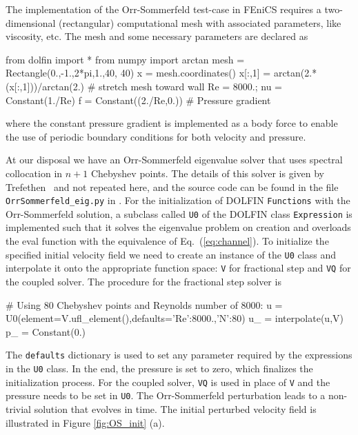 The implementation of the Orr-Sommerfeld test-case in FEniCS requires a two-dimensional (rectangular) computational mesh with associated parameters, like viscosity, etc. The  mesh and some necessary parameters are declared as
\begin{fenicscode}{0.9}
    from dolfin import *
    from numpy import arctan
    mesh = Rectangle(0.,-1.,2*pi,1.,40, 40)
    x = mesh.coordinates()
    x[:,1] = arctan(2.*(x[:,1]))/arctan(2.)  # stretch mesh toward wall
    Re = 8000.; nu = Constant(1./Re)
    f = Constant((2./Re,0.)) # Pressure gradient
\end{fenicscode}
where the constant pressure gradient is implemented as a body force to enable the use of periodic boundary conditions for both velocity and pressure. 

At our disposal we have an Orr-Sommerfeld eigenvalue solver that uses spectral collocation in $n+1$ Chebyshev points. The details of this solver is given by Trefethen~\cite{tref06} and not repeated here, and the source code can be found in the file {\fontsize{12pt}{12pt}\verb!OrrSommerfeld_eig.py!} in \cite{folder}. For the initialization of DOLFIN {\fontsize{12pt}{12pt}\texttt{Functions}} with the Orr-Sommerfeld solution, a subclass called {\fontsize{12pt}{12pt}\texttt{U0}} of the DOLFIN class {\fontsize{12pt}{12pt}\texttt{Expression}} is implemented such that it solves the eigenvalue problem on creation and overloads the eval function with the equivalence of Eq.~(\ref{eq:channel}). To initialize the specified initial velocity field we need to create an instance of the {\fontsize{12pt}{12pt}\texttt{U0}} class and interpolate it onto the appropriate function space: {\fontsize{12pt}{12pt}\texttt{V}} for fractional step and {\fontsize{12pt}{12pt}\texttt{VQ}} for the coupled solver. The procedure for the fractional step solver is
\begin{fenicscode}{0.9}
    # Using 80 Chebyshev points and Reynolds number of 8000:
    u = U0(element=V.ufl_element(),defaults={'Re':8000.,'N':80}) 
    u_ = interpolate(u,V)
    p_ = Constant(0.)
\end{fenicscode}
The {\fontsize{12pt}{12pt}\texttt{defaults}} dictionary is used to set any parameter required by the 
expressions in the {\fontsize{12pt}{12pt}\texttt{U0}} class. In the end, the pressure is set to zero, which finalizes the initialization process. For the coupled solver, {\fontsize{12pt}{12pt}\texttt{VQ}} is used in place of {\fontsize{12pt}{12pt}\texttt{V}} and the pressure needs to be set in {\fontsize{12pt}{12pt}\texttt{U0}}. The Orr-Sommerfeld perturbation leads to a non-trivial solution that evolves in time. The initial perturbed velocity field is illustrated in Figure \ref{fig:OS_init} (a).
